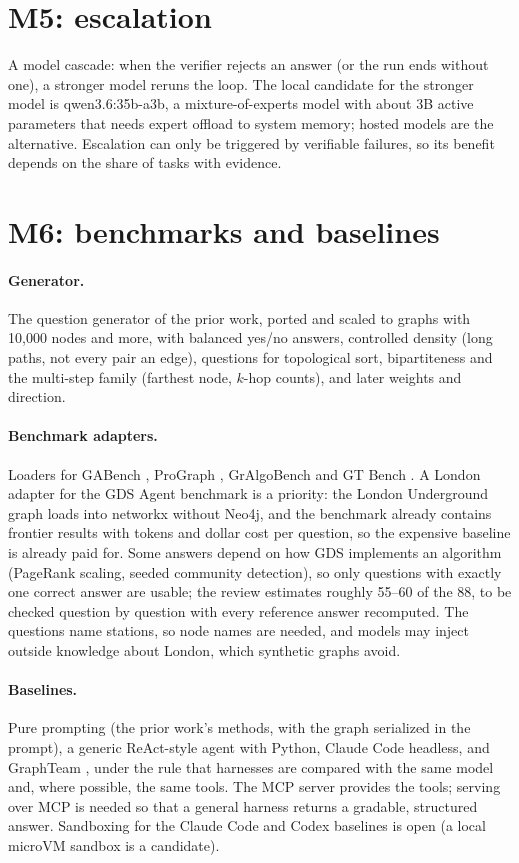 \section{M5: escalation}

A model cascade: when the verifier rejects an answer (or the run ends without one), a stronger model reruns the loop.
The local candidate for the stronger model is qwen3.6:35b-a3b, a mixture-of-experts model with about 3B active
parameters that needs expert offload to system memory; hosted models are the alternative. Escalation can only be
triggered by verifiable failures, so its benefit depends on the share of tasks with evidence.

\section{M6: benchmarks and baselines}

\paragraph{Generator.} The question generator of the prior work, ported and scaled to graphs with 10,000 nodes and
more, with balanced yes/no answers, controlled density (long paths, not every pair an edge), questions for
topological sort, bipartiteness and the multi-step family (farthest node, $k$-hop counts), and later weights and
direction.

\paragraph{Benchmark adapters.} Loaders for GABench \cite{gabench}, ProGraph \cite{prograph}, GrAlgoBench
\cite{gralgobench} and GT Bench \cite{gtbench}. A London adapter for the GDS Agent benchmark \cite{gdsagentbench} is a
priority: the London Underground graph loads into networkx without Neo4j, and the benchmark already contains frontier
results with tokens and dollar cost per question, so the expensive baseline is already paid for. Some answers depend
on how GDS implements an algorithm (PageRank scaling, seeded community detection), so only questions with exactly one
correct answer are usable; the review estimates roughly 55--60 of the 88, to be checked question by question with
every reference answer recomputed. The questions name stations, so node names are needed, and models may inject
outside knowledge about London, which synthetic graphs avoid.

\paragraph{Baselines.} Pure prompting (the prior work's methods, with the graph serialized in the prompt), a generic
ReAct-style agent with Python, Claude Code headless, and GraphTeam \cite{graphteam}, under the rule that harnesses are
compared with the same model and, where possible, the same tools. The MCP server provides the tools; serving
 over MCP is needed so that a general harness returns a gradable, structured answer. Sandboxing for
the Claude Code and Codex baselines is open (a local microVM sandbox is a candidate).

